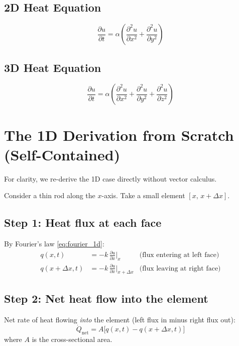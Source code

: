 \documentclass[11pt]{article}
\newcommand{\pd}[2]{\frac{\partial #1}{\partial #2}}
\newcommand{\pdd}[2]{\frac{\partial^2 #1}{\partial #2^2}}
\begin{document}
\subsection{2D Heat Equation}

\begin{equation}
  \pd{u}{t} = \alpha\!\left(\pdd{u}{x} + \pdd{u}{y}\right)
  \label{eq:heat_2d}
\end{equation}

\subsection{3D Heat Equation}

\begin{equation}
  \pd{u}{t} = \alpha\!\left(\pdd{u}{x} + \pdd{u}{y} + \pdd{u}{z}\right)
  \label{eq:heat_3d}
\end{equation}

\section{The 1D Derivation from Scratch (Self-Contained)}

For clarity, we re-derive the 1D case directly without vector calculus.

\medskip
\noindent
Consider a thin rod along the $x$-axis. Take a small element $[x,\, x + \Delta x]$.

\subsection{Step 1: Heat flux at each face}

By Fourier's law \eqref{eq:fourier_1d}:
\begin{align}
  q(x,t) &= -k\,\pd{u}{x}\bigg|_x
    &\text{(flux entering at left face)} \\[6pt]
  q(x+\Delta x,t) &= -k\,\pd{u}{x}\bigg|_{x+\Delta x}
    &\text{(flux leaving at right face)}
\end{align}

\subsection{Step 2: Net heat flow into the element}

Net rate of heat flowing \emph{into} the element (left flux in minus right flux out):
\begin{equation}
  \dot{Q}_{\text{net}} = A\bigl[q(x,t) - q(x+\Delta x,t)\bigr]
\end{equation}
where $A$ is the cross-sectional area.
\end{document}
